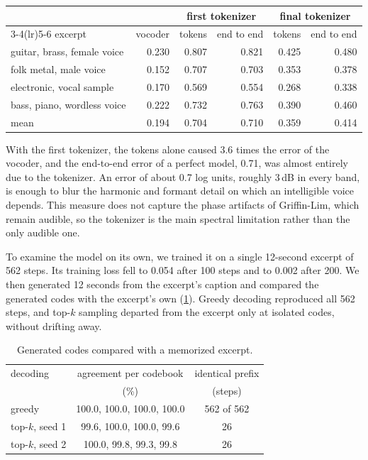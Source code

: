 \begin{widetable}
\caption{Spectral error of each stage on four held-out vocal excerpts, in log
units per mel band, for the first tokenizer and the final one.}
\label{tab:reconstruction}
\small
\begin{tabular}{lrrrrr}
\toprule
 & & \multicolumn{2}{c}{first tokenizer} & \multicolumn{2}{c}{final tokenizer} \\
\cmidrule(lr){3-4}\cmidrule(lr){5-6}
excerpt & vocoder & tokens & end to end & tokens & end to end \\
\midrule
guitar, brass, female voice & 0.230 & 0.807 & 0.821 & 0.425 & 0.480 \\
folk metal, male voice & 0.152 & 0.707 & 0.703 & 0.353 & 0.378 \\
electronic, vocal sample & 0.170 & 0.569 & 0.554 & 0.268 & 0.338 \\
bass, piano, wordless voice & 0.222 & 0.732 & 0.763 & 0.390 & 0.460 \\
\midrule
mean & 0.194 & 0.704 & 0.710 & 0.359 & 0.414 \\
\bottomrule
\end{tabular}
\end{widetable}

With the first tokenizer, the tokens alone caused 3.6 times the error of the
vocoder, and the end-to-end error of a perfect model, 0.71, was almost entirely
due to the tokenizer. An error of about 0.7 log units, roughly 3\,dB in every
band, is enough to blur the harmonic and formant detail on which an intelligible
voice depends. This measure does not capture the phase artifacts of
Griffin-Lim, which remain audible, so the tokenizer is the main spectral
limitation rather than the only audible one.

To examine the model on its own, we trained it on a single 12-second excerpt of
562 steps. Its training loss fell to 0.054 after 100 steps and to 0.002 after
200. We then generated 12 seconds from the excerpt's caption and compared the
generated codes with the excerpt's own (\cref{tab:memorization}). Greedy
decoding reproduced all 562 steps, and top-$k$ sampling departed from the
excerpt only at isolated codes, without drifting away.

\begin{table}[htbp]
\centering
\caption{Generated codes compared with a memorized excerpt.}
\label{tab:memorization}
\small
\begin{tabular}{lcc}
\toprule
decoding & agreement per codebook & identical prefix \\
 & (\%) & (steps) \\
\midrule
greedy & 100.0, 100.0, 100.0, 100.0 & 562 of 562 \\
top-$k$, seed 1 & 99.6, 100.0, 100.0, 99.6 & 26 \\
top-$k$, seed 2 & 100.0, 99.8, 99.3, 99.8 & 26 \\
\bottomrule
\end{tabular}
\end{table}

